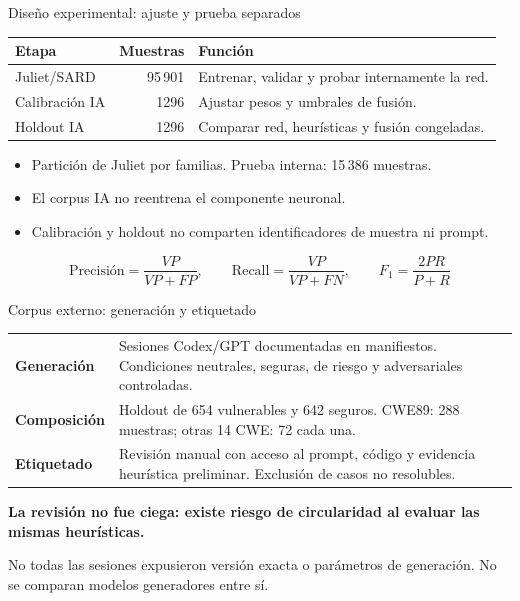 \begin{frame}[t]{Diseño experimental: ajuste y prueba separados}
\small
\begin{tabularx}{\textwidth}{@{}p{32mm}rX@{}}
\toprule
\textbf{Etapa} & \textbf{Muestras} & \textbf{Función}\\\midrule
Juliet/SARD & 95\,901 & Entrenar, validar y probar internamente la red.\\[2mm]
Calibración IA & 1296 & Ajustar pesos y umbrales de fusión.\\[2mm]
Holdout IA & 1296 & Comparar red, heurísticas y fusión congeladas.\\\bottomrule
\end{tabularx}
\par\vspace{5mm}\normalsize
\begin{itemize}\setlength{\itemsep}{1.5mm}
\item Partición de Juliet por familias. Prueba interna: 15\,386 muestras.
\item El corpus IA no reentrena el componente neuronal.
\item Calibración y holdout no comparten identificadores de muestra ni prompt.
\end{itemize}
\par\vspace{2mm}\small
\[
\mathrm{Precisión}=\frac{VP}{VP+FP},\qquad
\mathrm{Recall}=\frac{VP}{VP+FN},\qquad
F_1=\frac{2PR}{P+R}
\]
\end{frame}

\begin{frame}{Corpus externo: generación y etiquetado}
\small
\begin{tabularx}{\textwidth}{@{}p{30mm}X@{}}
\toprule
\textbf{Generación} & Sesiones Codex/GPT documentadas en manifiestos. Condiciones neutrales, seguras, de riesgo y adversariales controladas.\\[2mm]
\textbf{Composición} & Holdout de 654 vulnerables y 642 seguros. CWE89: 288 muestras; otras 14 CWE: 72 cada una.\\[2mm]
\textbf{Etiquetado} & Revisión manual con acceso al prompt, código y evidencia heurística preliminar. Exclusión de casos no resolubles.\\\bottomrule
\end{tabularx}
\par\vspace{5mm}\normalsize
\textbf{La revisión no fue ciega: existe riesgo de circularidad al evaluar las mismas heurísticas.}
\par\vspace{4mm}\small
No todas las sesiones expusieron versión exacta o parámetros de generación. No se comparan modelos generadores entre sí.
\end{frame}

